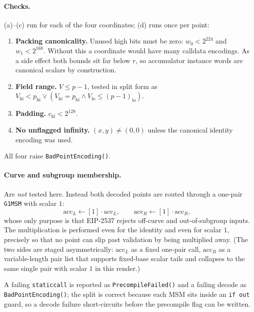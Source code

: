 \documentclass[11pt,a4paper]{article}
\newcommand{\code}[1]{\texttt{#1}}
\newcommand{\err}[1]{\textcolor{red!60!black}{\texttt{#1}}}
\theoremstyle{definition}
\begin{document}
\paragraph{Checks.} (a)--(c) run for each of the four coordinates; (d) runs
once per point:
\begin{enumerate}[label=(\alph*),leftmargin=1cm]
\item \textbf{Packing canonicality.} Unused high bits must be zero:
      $w_0 < 2^{224}$ and $w_1 < 2^{168}$. Without this a coordinate would have
      many calldata encodings. As a side effect both bounds sit far below $r$,
      so accumulator instance words are canonical scalars by construction.
\item \textbf{Field range.} $V \le p-1$, tested in split form as
      $V_{\mathrm{hi}} < p_{\mathrm{hi}} \vee (V_{\mathrm{hi}} = p_{\mathrm{hi}} \wedge V_{\mathrm{lo}} \le (p-1)_{\mathrm{lo}})$.
\item \textbf{Padding.} $c_{\mathrm{hi}} < 2^{128}$.
\item \textbf{No unflagged infinity.} $(x,y) \neq (0,0)$ unless the canonical
      identity encoding was used.
\end{enumerate}
All four raise \err{BadPointEncoding()}.

\paragraph{Curve and subgroup membership.}
Are \emph{not} tested here. Instead both decoded points are routed through a
one-pair \code{G1MSM} with scalar $1$:
\[
\mathrm{acc}_L \leftarrow [1]\cdot \mathrm{acc}_L,
\qquad
\mathrm{acc}_R \leftarrow [1]\cdot \mathrm{acc}_R,
\]
whose only purpose is that EIP-2537 rejects off-curve and out-of-subgroup
inputs. The multiplication is performed even for the identity and even for
scalar $1$, precisely so that no point can slip past validation by being
multiplied away. (The two sides are staged asymmetrically: $\mathrm{acc}_L$
as a fixed one-pair call, $\mathrm{acc}_R$ as a variable-length pair list that
supports fixed-base scalar tails and collapses to the same single pair with
scalar $1$ in this render.)

A failing \code{staticcall} is reported as \err{PrecompileFailed()} and a
failing decode as \err{BadPointEncoding()}; the split is correct because each
MSM sits inside an \code{if out} guard, so a decode failure short-circuits
before the precompile flag can be written.

\end{document}

